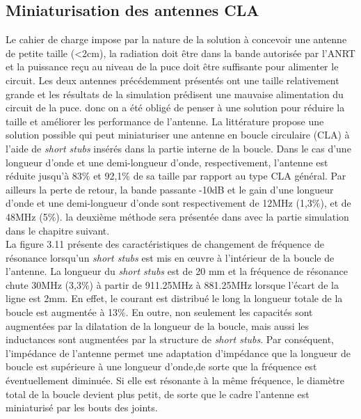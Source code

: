 \documentclass[11pt, a4paper, twoside]{book}
\begin{document}
\subsection{Miniaturisation des antennes CLA}
Le cahier de charge impose par la nature de la solution à concevoir une antenne de petite taille (<2cm), la radiation doit être dans la bande autorisée par l'ANRT et la puissance reçu au niveau de la puce doit être suffisante pour alimenter le circuit. Les deux antennes précédemment présentés ont une taille relativement grande et les résultats de la simulation prédisent une mauvaise alimentation du circuit de la puce. donc on a été obligé de penser à une solution pour réduire la taille et améliorer les performance de l'antenne. La littérature \cite{stub}  propose une solution possible qui peut
miniaturiser une antenne en boucle circulaire (CLA) à l'aide de \emph{short stubs} insérés dans la partie interne de la boucle. Dans le cas d'une longueur d'onde et une demi-longueur d'onde, respectivement, l'antenne est réduite jusqu'à 83\% et 92,1\% de sa taille par rapport au type CLA général. Par ailleurs la perte de retour, la bande passante -10dB et le gain d'une longueur d'onde et une demi-longueur d'onde sont respectivement de 12MHz (1,3\%), et de 48MHz (5\%). la deuxième méthode sera présentée dans avec la partie simulation dans le chapitre suivant.\\

La figure 3.11 présente des caractéristiques de changement de fréquence de résonance lorsqu'un \emph{short stubs} est mis en œuvre à l'intérieur de la boucle de l'antenne. La longueur du  \emph{short stubs} est de 20 mm et la fréquence de résonance chute 30MHz (3,3\%) à partir de 911.25MHz à 881.25MHz lorsque l'écart de la ligne est 2mm. En effet, le courant est distribué le long la longueur totale de la boucle est augmentée à 13\%. En outre, non seulement les capacités sont augmentées par la dilatation de la longueur de la boucle, mais aussi les inductances sont augmentées par la structure de \emph{short stubs}. Par conséquent, l'impédance de l'antenne permet une adaptation d'impédance que la longueur de boucle est supérieure à une longueur d'onde,de sorte que la fréquence est éventuellement diminuée. Si elle est résonante à la même fréquence, le diamètre total de la boucle devient plus petit, de sorte que le cadre l'antenne est miniaturisé par les bouts des joints.
\end{document}
